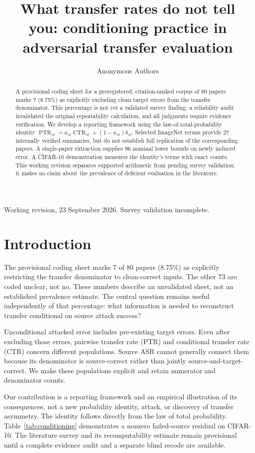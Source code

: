 \documentclass[10pt]{article}
\title{What transfer rates do not tell you: conditioning practice in adversarial transfer evaluation}
\author{\name Anonymous Authors}
\begin{document}
\maketitle
\begin{center}\small Working revision, 23 September 2026. Survey validation incomplete.\end{center}
\begin{abstract}
A provisional coding sheet for a preregistered, citation-ranked corpus of 80 papers marks 7 (8.75\%) as explicitly excluding clean target errors from the transfer denominator. This percentage is not yet a validated survey finding: a reliability audit invalidated the original repeatability calculation, and all judgments require evidence verification. We develop a reporting framework using the law-of-total-probability identity $\operatorname{PTR}_{st}=a_{st}\operatorname{CTR}_{st}+(1-a_{st})b_{st}$. Selected ImageNet reruns provide 27 internally verified summaries, but do not establish full replication of the corresponding papers. A single-paper extraction supplies 96 nominal lower bounds on newly induced error. A CIFAR-10 demonstration measures the identity's terms with exact counts. This working revision separates supported arithmetic from pending survey validation; it makes no claim about the prevalence of deficient evaluation in the literature.
\end{abstract}

\section{Introduction}
The provisional coding sheet marks 7 of 80 papers (8.75\%) as explicitly restricting the transfer denominator to clean-correct inputs. The other 73 are coded unclear, not no. These numbers describe an unvalidated sheet, not an established prevalence estimate. The central question remains useful independently of that percentage: what information is needed to reconstruct transfer conditional on source attack success?

Unconditional attacked error includes pre-existing target errors. Even after excluding those errors, pairwise transfer rate (PTR) and conditional transfer rate (CTR) concern different populations. Source ASR cannot generally connect them because its denominator is source-correct rather than jointly source-and-target-correct. We make these populations explicit and retain numerator and denominator counts.

Our contribution is a reporting framework and an empirical illustration of its consequences, not a new probability identity, attack, or discovery of transfer asymmetry. The identity follows directly from the law of total probability. Table~\ref{tab:conditioning} demonstrates a nonzero failed-source residual on CIFAR-10. The literature survey and its recomputability estimate remain provisional until a complete evidence audit and a separate blind recode are available.
\end{document}
